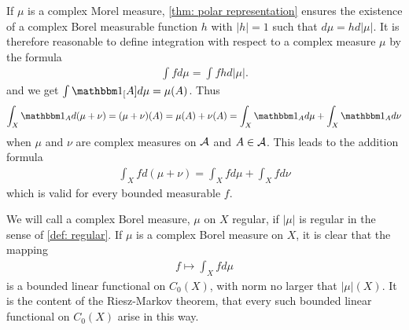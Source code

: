 \documentclass[../../main.tex]{subfiles}
\begin{document}
If $\mu$ is a complex Morel measure, \cref{thm: polar representation} ensures the existence of a complex Borel measurable function $h$ with $|h|=1$ such that $d\mu=hd|\mu|$. It is therefore reasonable to define integration with respect to a complex measure $\mu$ by the formula
\begin{align*}
	\int fd\mu=\int fhd|\mu|.
\end{align*}
and we get $\int \ind[A] d\mu=\mu(A)$. Thus
\begin{align*}
	\int_{X}\ind{A} d(\mu+\nu)=(\mu+\nu)(A)=\mu(A)+\nu(A)=\int_{X}\ind{A}d\mu+\int_{X} \ind{A} d\nu
\end{align*}
when $\mu$ and $\nu$ are complex measures on $\mathcal{A}$ and $A\in \mathcal{A}$. This leads to the addition formula
\begin{align*}
	\int_{X} fd(\mu+\nu)=\int_{X}fd\mu+\int_{X}fd\nu
\end{align*}
which is valid for every bounded measurable $f$.

We will call a complex Borel measure, $\mu$ on $X$ regular, if $|\mu|$ is regular in the sense of \cref{def: regular}. If $\mu$ is a complex Borel measure on $X$, it is clear that the mapping
\begin{align*}
	f\mapsto \int_{X}fd\mu
\end{align*}
is a bounded linear functional on $C_{0}(X)$, with norm no larger that $|\mu|(X)$.
It is the content of the Riesz-Markov theorem, that every such bounded linear functional on $C_{0}(X)$ arise in this way.
\end{document}
